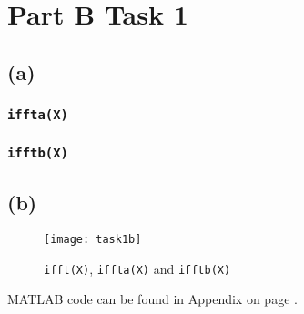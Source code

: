 \documentclass{article}
\newenvironment{homeworkProblem}[1]{
	\section*{#1}
	}{
}
\newenvironment{homeworkSection}[1]{
	\subsection*{#1}
	}{
}
\begin{document}
\begin{homeworkProblem}{Part B Task 1}


\begin{homeworkSection}{(a)}

\subsubsection*{\texttt{iffta(X)}}


\subsubsection*{\texttt{ifftb(X)}}


\end{homeworkSection}


\begin{homeworkSection}{(b)}

\begin{figure}[H]
\centering
\texttt{[image: task1b]}
\caption{\texttt{ifft(X)}, \texttt{iffta(X)} and \texttt{ifftb(X)}}
\label{task1b}
\end{figure}

MATLAB code can be found in Appendix on page \pageref{task1b_code}.

\end{homeworkSection}


\end{homeworkProblem}

\end{document}
